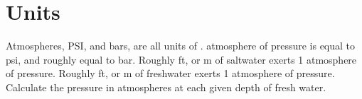 \documentclass[12pt,letter]{exam}
\begin{document}
\begin{questions}
    \begin{solution}
    \end{solution}
\section{Units}
    \question Atmospheres, PSI, and bars, are all units of \fillin[pressure].
     atmosphere of pressure is equal to \fillin[14.7] psi, and roughly equal to \fillin[1] bar.
    \question Roughly \fillin[33] ft, or \fillin[10] m of saltwater exerts 1 atmosphere of pressure.
    \question Roughly \fillin[34] ft, or \fillin[10.3] m of freshwater exerts 1 atmosphere of pressure.
    \question Calculate the pressure in atmospheres at each given depth of fresh water.
    \begin{parts}

\end{parts}
\end{questions}
\end{document}
